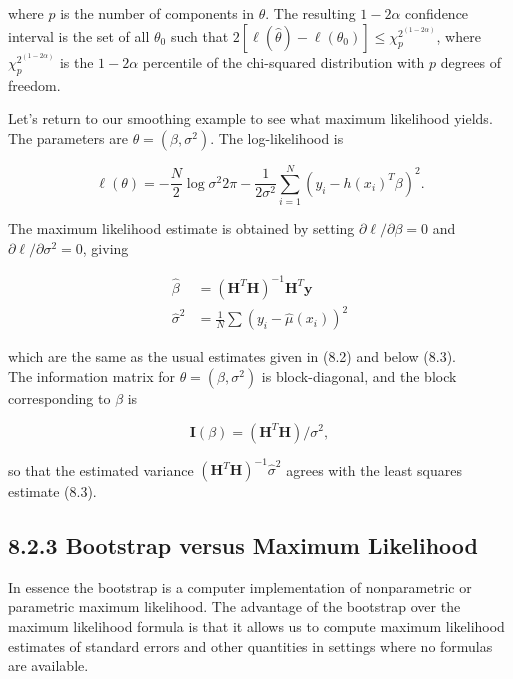\documentclass[10pt]{article}
\begin{document}
where $p$ is the number of components in $\theta$. The resulting $1-2 \alpha$ confidence interval is the set of all $\theta_{0}$ such that $2\left[\ell(\hat{\theta})-\ell\left(\theta_{0}\right)\right] \leq \chi_{p}^{2^{(1-2 \alpha)}}$, where $\chi_{p}^{2^{(1-2 \alpha)}}$ is the $1-2 \alpha$ percentile of the chi-squared distribution with $p$ degrees of freedom.

Let's return to our smoothing example to see what maximum likelihood yields. The parameters are $\theta=\left(\beta, \sigma^{2}\right)$. The log-likelihood is


\begin{equation*}
\ell(\theta)=-\frac{N}{2} \log \sigma^{2} 2 \pi-\frac{1}{2 \sigma^{2}} \sum_{i=1}^{N}\left(y_{i}-h\left(x_{i}\right)^{T} \beta\right)^{2} . \tag{8.20}
\end{equation*}


The maximum likelihood estimate is obtained by setting $\partial \ell / \partial \beta=0$ and $\partial \ell / \partial \sigma^{2}=0$, giving


\begin{align*}
\hat{\beta} & =\left(\mathbf{H}^{T} \mathbf{H}\right)^{-1} \mathbf{H}^{T} \mathbf{y} \\
\hat{\sigma}^{2} & =\frac{1}{N} \sum\left(y_{i}-\hat{\mu}\left(x_{i}\right)\right)^{2} \tag{8.21}
\end{align*}


which are the same as the usual estimates given in (8.2) and below (8.3).\\
The information matrix for $\theta=\left(\beta, \sigma^{2}\right)$ is block-diagonal, and the block corresponding to $\beta$ is


\begin{equation*}
\mathbf{I}(\beta)=\left(\mathbf{H}^{T} \mathbf{H}\right) / \sigma^{2}, \tag{8.22}
\end{equation*}


so that the estimated variance $\left(\mathbf{H}^{T} \mathbf{H}\right)^{-1} \hat{\sigma}^{2}$ agrees with the least squares estimate (8.3).

\subsection*{8.2.3 Bootstrap versus Maximum Likelihood}
In essence the bootstrap is a computer implementation of nonparametric or parametric maximum likelihood. The advantage of the bootstrap over the maximum likelihood formula is that it allows us to compute maximum likelihood estimates of standard errors and other quantities in settings where no formulas are available.
\end{document}
